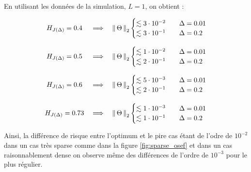 En utilisant les données de la simulation, $L = 1$, on obtient :

\begin{equation}
	\begin{array}{ccc}
		H_{J(\Delta)} = 0.4  & \implies & \left\lVert \, \Theta \, \right\rVert _ {2}
		\begin{cases}
			\lesssim 3 \cdot 10^{-2} \quad & \Delta = 0.01
			\\
			\lesssim 3\cdot 10^{-1} \quad  & \Delta = 0.2
		\end{cases}
		\\\\
		H_{J(\Delta)} = 0.5  & \implies & \left\lVert \, \Theta \, \right\rVert _ {2}
		\begin{cases}
			\lesssim 1 \cdot 10^{-2} \quad & \Delta = 0.01
			\\
			\lesssim 2\cdot 10^{-1} \quad  & \Delta = 0.2
		\end{cases}
		\\\\
		H_{J(\Delta)} = 0.6  & \implies & \left\lVert \, \Theta \, \right\rVert _ {2}
		\begin{cases}
			\lesssim 5 \cdot 10^{-3} \quad & \Delta = 0.01
			\\
			\lesssim 2\cdot 10^{-1} \quad  & \Delta = 0.2
		\end{cases}
		\\\\
		H_{J(\Delta)} = 0.73 & \implies & \left\lVert \, \Theta \, \right\rVert _ {2}
		\begin{cases}
			\lesssim 1 \cdot 10^{-3} \quad & \Delta = 0.01
			\\
			\lesssim 1\cdot 10^{-1} \quad  & \Delta = 0.2
		\end{cases}
	\end{array}
\end{equation}

Ainsi, la différence de risque entre l'optimum et le pire cas étant de l'odre de $10^{-2}$ dans un cas très sparse comme dans la figure \ref{fig:sparse_osef} et dans un cas raisonnablement dense on observe même des différences de l'ordre de $10^{-3}$ pour le plus régulier.

